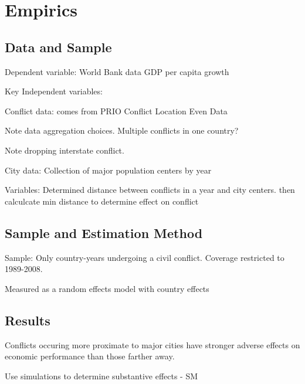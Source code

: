 \section{Empirics}
\label{empirics}

\subsection{Data and Sample}

Dependent variable: World Bank data GDP per capita growth 

Key Independent variables: 

	Conflict data: comes from PRIO Conflict Location Even Data 

		Note data aggregation choices.  Multiple conflicts in one country?

		Note dropping interstate conflict.

	City data: Collection of major population centers by year 

	Variables: Determined distance between conflicts in a year and city centers. then calculcate min distance to determine effect on conflict 

\subsection{Sample and Estimation Method}

Sample: Only country-years undergoing a civil conflict. Coverage restricted to 1989-2008. 

Measured as a random effects model with country effects 

\subsection{Results} 

Conflicts occuring more proximate to major cities have stronger adverse effects on economic performance than those farther away. 

Use simulations to determine substantive effects - SM